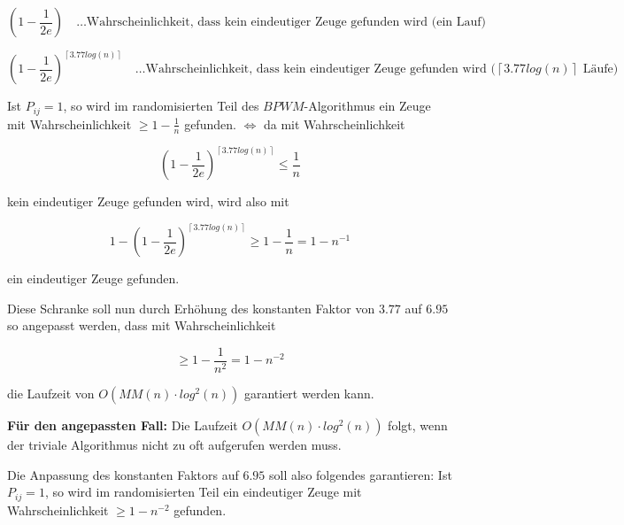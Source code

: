 \documentclass{article}
\begin{document}
\begin{equation}
  \left( 1 - \frac{1}{2e} \right) \quad \text{\ldots Wahrscheinlichkeit, dass
    kein eindeutiger Zeuge gefunden wird (ein Lauf)}
\end{equation}

\begin{equation}
  \left( 1 - \frac{1}{2e} \right)^{\left\lceil 3.77log(n) \right\rceil} \quad
    \text{\ldots Wahrscheinlichkeit, dass kein eindeutiger Zeuge gefunden wird
    ($\left\lceil 3.77log(n) \right\rceil$ L{\"a}ufe)}
\end{equation}

Ist $P_{ij} = 1$, so wird im randomisierten Teil des $BPWM$-Algorithmus ein Zeuge
mit Wahrscheinlichkeit $\geq 1 - \frac{1}{n}$ gefunden.
$\Longleftrightarrow$ da mit Wahrscheinlichkeit

\begin{equation}
  \left( 1 - \frac{1}{2e} \right)^{\left\lceil 3.77log(n) \right\rceil} \leq \frac{1}{n}
\end{equation}

kein eindeutiger Zeuge gefunden wird, wird also mit

\begin{equation}
  1 - \left( 1 - \frac{1}{2e} \right)^{\left\lceil 3.77log(n) \right\rceil} \geq 1 - \frac{1}{n} = 1 - n^{-1}
\end{equation}

ein eindeutiger Zeuge gefunden.

Diese Schranke soll nun durch Erh{\"o}hung des konstanten Faktor von $3.77$ auf
$6.95$ so angepasst werden, dass mit Wahrscheinlichkeit

\begin{equation}
  \geq 1 - \frac{1}{n^2} = 1 - n^{-2}
\end{equation}

die Laufzeit von $O \left( MM \left( n \right) \cdot log^2(n) \right)$ garantiert
werden kann.

{\bfseries F{\"u}r den angepassten Fall:} \newline
Die Laufzeit $O \left( MM \left( n \right) \cdot log^2(n) \right)$ folgt, wenn
der triviale Algorithmus nicht zu oft aufgerufen werden muss.

Die Anpassung des konstanten Faktors auf $6.95$ soll also folgendes garantieren:
\newline
Ist $P_{ij} = 1$, so wird im randomisierten Teil ein eindeutiger Zeuge mit
Wahrscheinlichkeit $\geq 1 - n^{-2}$ gefunden.
\end{document}
